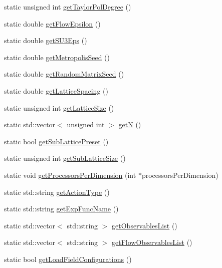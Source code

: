 \begin{DoxyCompactItemize}
\item 
static unsigned int \mbox{\hyperlink{class_parameters_a272f8ebfbd305fb4a3b03db68417fc90}{get\+Taylor\+Pol\+Degree}} ()
\item 
static double \mbox{\hyperlink{class_parameters_a96dbafc27f287de83dfaec3bc2d45efe}{get\+Flow\+Epsilon}} ()
\item 
static double \mbox{\hyperlink{class_parameters_ac14d1b11099fdfa254fb138d4471ceb2}{get\+S\+U3\+Eps}} ()
\item 
static double \mbox{\hyperlink{class_parameters_ae63389dad9d4564f4849137d2ab37df5}{get\+Metropolis\+Seed}} ()
\item 
static double \mbox{\hyperlink{class_parameters_a92d9e73e333b01745747e55d9ae4f7cc}{get\+Random\+Matrix\+Seed}} ()
\item 
static double \mbox{\hyperlink{class_parameters_aabe7e3a2468cf11bb5e98e626cb94ff2}{get\+Lattice\+Spacing}} ()
\item 
static unsigned int \mbox{\hyperlink{class_parameters_a128ccc4cb31e9930a825cfd3b8e83d2e}{get\+Lattice\+Size}} ()
\item 
static std\+::vector$<$ unsigned int $>$ \mbox{\hyperlink{class_parameters_a41e524d54a2e4b2448b61d16ef46f534}{getN}} ()
\item 
static bool \mbox{\hyperlink{class_parameters_ab9d9f206373cdad11d48ab08222204e3}{get\+Sub\+Lattice\+Preset}} ()
\item 
static unsigned int \mbox{\hyperlink{class_parameters_aff629ab94d99807364926008fb4e1e67}{get\+Sub\+Lattice\+Size}} ()
\item 
static void \mbox{\hyperlink{class_parameters_a6b13faa642ebaf458203ae111a536d7a}{get\+Processors\+Per\+Dimension}} (int $\ast$processors\+Per\+Dimension)
\item 
static std\+::string \mbox{\hyperlink{class_parameters_afc824aec2ab48afe06829050d0fbe966}{get\+Action\+Type}} ()
\item 
static std\+::string \mbox{\hyperlink{class_parameters_a9fa8d9376dcba8e98b3fff764e1059d7}{get\+Exp\+Func\+Name}} ()
\item 
static std\+::vector$<$ std\+::string $>$ \mbox{\hyperlink{class_parameters_a5153ee54f768139539ebd3cc1a6f497d}{get\+Observables\+List}} ()
\item 
static std\+::vector$<$ std\+::string $>$ \mbox{\hyperlink{class_parameters_a7f1edc3384a46b6e4fc5e380a8fe6d41}{get\+Flow\+Observables\+List}} ()
\item 
static bool \mbox{\hyperlink{class_parameters_a5a11841ee32f68ebd27a8146a3fda07b}{get\+Load\+Field\+Configurations}} ()

\end{DoxyCompactItemize}
